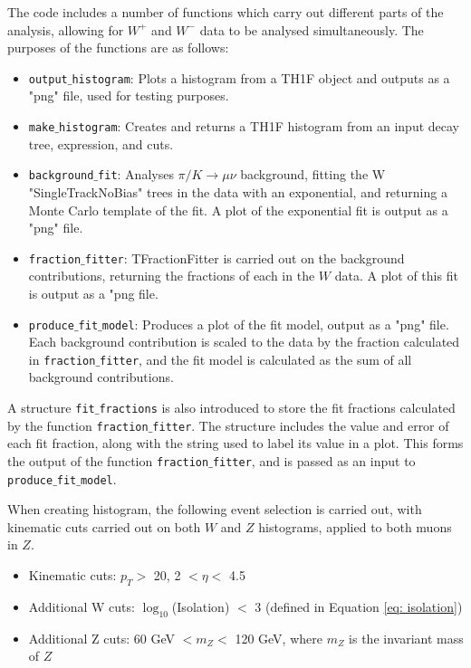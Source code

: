 \documentclass[a4paper]{article}
\begin{document}
The code includes a number of functions which carry out different parts of the analysis, allowing for $W^+$ and $W^-$ data to be analysed simultaneously. The purposes of the functions are as follows:
\begin{itemize}
    \item \texttt{output$\_$histogram}: Plots a histogram from a TH1F object and outputs as a "png" file, used for testing purposes.
    \item \texttt{make$\_$histogram}: Creates and returns a TH1F histogram from an input decay tree, expression, and cuts.
    \item \texttt{background$\_$fit}: Analyses $\pi/K \xrightarrow{} \mu\nu$ background, fitting the W "SingleTrackNoBias" trees in the data with an exponential, and returning a Monte Carlo template of the fit. A plot of the exponential fit is output as a "png" file.
    \item \texttt{fraction$\_$fitter}: TFractionFitter is carried out on the background contributions, returning the fractions of each in the $W$ data. A plot of this fit is output as a "png file. 
    \item \texttt{produce$\_$fit$\_$model}: Produces a plot of the fit model, output as a "png" file. Each background contribution is scaled to the data by the fraction calculated in \texttt{fraction$\_$fitter}, and the fit model is calculated as the sum of all background contributions.
\end{itemize}
A structure \texttt{fit$\_$fractions} is also introduced to store the fit fractions calculated by the function \texttt{fraction$\_$fitter}. The structure includes the value and error of each fit fraction, along with the string used to label its value in a plot. This forms the output of the function \texttt{fraction$\_$fitter}, and is passed as an input to \texttt{produce$\_$fit$\_$model}.

When creating histogram, the following event selection is carried out, with kinematic cuts carried out on both $W$ and $Z$ histograms, applied to both muons in $Z$.
\begin{itemize}
    \item Kinematic cuts: $p_T >$ 20, 2 $< \eta <$ 4.5
    \item Additional W cuts: $\log_{10}$(Isolation) $<$ 3 (defined in Equation \ref{eq: isolation})
    \item Additional Z cuts: 60 GeV $< m_Z <$ 120 GeV, where $m_Z$ is the invariant mass of $Z$
\end{itemize}
\end{document}
